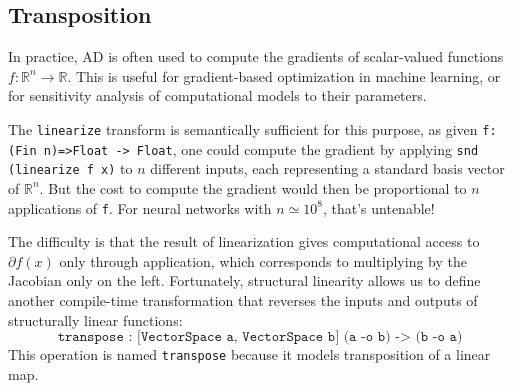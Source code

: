 \documentclass[acmsmall,screen,nonacm]{acmart}
\newcommand{\ttt}[1]{\texttt{#1}}
\newcommand{\R}{\mathbb{R}}
\newcommand{\diffenv}{\Delta}
\newcommand{\linreifyop}[3]{#1\vdash \mathcal{L}_{#2}[ #3 ] }
\newcommand{\linreify}[3]{\linreifyop{#1}{#2}{#3} \rightsquigarrow }
\newcommand{\zeroat}[1]{\ttt{Zero}[#1]}
\newcommand{\tangentof}[1]{\ttt{Tan}[#1]}
\begin{document}

\subsection{Transposition}
\label{sec:transposition}

In practice, AD is often used to compute the gradients of scalar-valued functions $f: \R^n \to \R$.
This is useful for gradient-based optimization in machine learning, or for sensitivity analysis of computational models to their parameters.

The \texttt{linearize} transform is semantically sufficient for this purpose, as given \texttt{f: (Fin n)=>Float -> Float}, one could compute the gradient by applying \texttt{snd (linearize f x)} to $n$ different inputs, each representing a standard basis vector of $\R^n$.
But the cost to compute the gradient would then be proportional to $n$ applications of \texttt{f}.
For neural networks with $n \simeq 10^8$, that's untenable!

The difficulty is that the result of linearization gives computational access to $\partial f(x)$ only through application, which corresponds to multiplying by the Jacobian only on the left.
Fortunately, structural linearity allows us to define another compile-time transformation that reverses the inputs and outputs of structurally linear functions:
\[
    \texttt{transpose : [VectorSpace a, VectorSpace b] (a -o b) -> (b -o a)}
\]
This operation is named \texttt{transpose} because it models transposition of a linear map.
\end{document}
